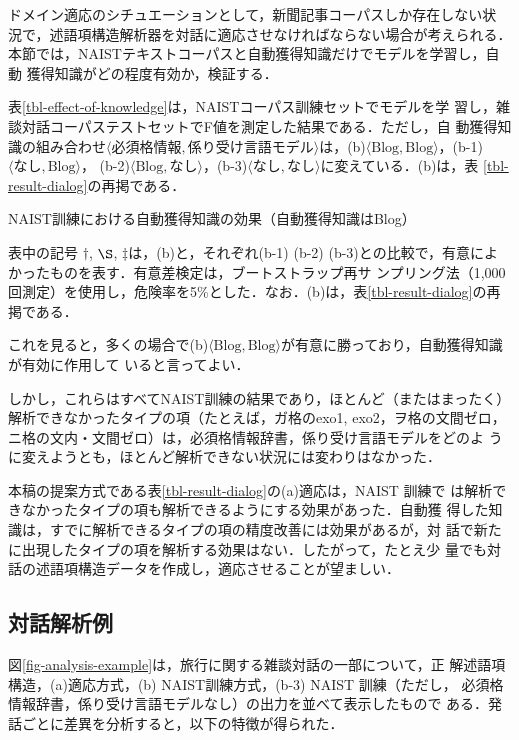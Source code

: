 \documentclass[japanese]{jnlp_1.4}
\begin{document}
ドメイン適応のシチュエーションとして，新聞記事コーパスしか存在しない状
況で，述語項構造解析器を対話に適応させなければならない場合が考えられる．
本節では，NAISTテキストコーパスと自動獲得知識だけでモデルを学習し，自動
獲得知識がどの程度有効か，検証する．

表\ref{tbl-effect-of-knowledge}は，NAISTコーパス訓練セットでモデルを学
習し，雑談対話コーパステストセットでF値を測定した結果である．ただし，自
動獲得知識の組み合わせ{$\langle \text{必須格情報}, \text{係り受け言語モデル} \rangle$}は，(b){$\langle \text{Blog}, \text{Blog}
\rangle$}，(b-1){$\langle \text{なし}, \text{Blog}\rangle$}，
(b-2){$\langle \text{Blog}, \text{なし} \rangle$}，(b-3){$\langle
\text{なし}, \text{なし}\rangle$}に変えている．(b)は，表
\ref{tbl-result-dialog}の再掲である．

\begin{table}[b]
\caption{NAIST訓練における自動獲得知識の効果（自動獲得知識はBlog）}
\label{tbl-effect-of-knowledge}

\par\vspace{8pt}\small
表中の記号 $\dag$, $\S$, $\ddag$は，(b)と，それぞれ(b-1) (b-2) (b-3)との比較で，有意によかったものを表す．有意差検定は，ブートストラップ再サ
ンプリング法（1,000回測定）を使用し，危険率を5\%とした．なお．(b)は，表\ref{tbl-result-dialog}の再掲である．
\end{table}

これを見ると，多くの場合で(b){$\langle \text{Blog},
\text{Blog}\rangle$}が有意に勝っており，自動獲得知識が有効に作用して
いると言ってよい．

しかし，これらはすべてNAIST訓練の結果であり，ほとんど（またはまったく）
解析できなかったタイプの項（たとえば，ガ格のexo1, exo2，ヲ格の文間ゼロ，
  ニ格の文内・文間ゼロ）は，必須格情報辞書，係り受け言語モデルをどのよ
うに変えようとも，ほとんど解析できない状況には変わりはなかった．

本稿の提案方式である表\ref{tbl-result-dialog}の(a)適応は，NAIST 訓練で
は解析できなかったタイプの項も解析できるようにする効果があった．自動獲
得した知識は，すでに解析できるタイプの項の精度改善には効果があるが，対
話で新たに出現したタイプの項を解析する効果はない．したがって，たとえ少
量でも対話の述語項構造データを作成し，適応させることが望ましい．


\subsection{対話解析例}
\label{sec-err-analysis}

図\ref{fig-analysis-example}は，旅行に関する雑談対話の一部について，正
解述語項構造，(a)適応方式，(b) NAIST訓練方式，(b-3) NAIST 訓練（ただし，
  必須格情報辞書，係り受け言語モデルなし）の出力を並べて表示したもので
ある．発話ごとに差異を分析すると，以下の特徴が得られた．
\end{document}
